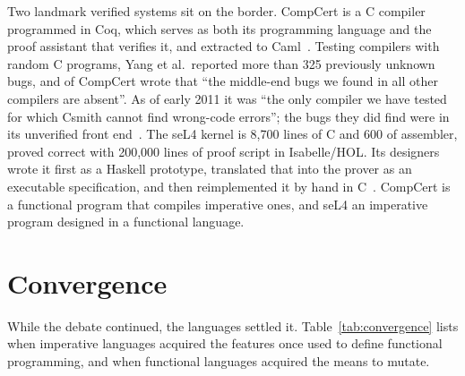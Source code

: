 \documentclass[11pt]{article}
\let\oldsection\section
\renewcommand{\section}{\Needspace{0.25\textheight}\oldsection}
\theoremstyle{definition}
\theoremstyle{remark}
\begin{document}
Two landmark verified systems sit on the border. CompCert is a C compiler
programmed in Coq, which serves as both its programming language and the
proof assistant that verifies it, and extracted to Caml~\cite{leroy}.
Testing compilers with random C programs, Yang et al.\ reported more
than 325 previously unknown bugs, and of CompCert wrote that ``the
middle-end bugs we found in all other compilers are absent''. As of early
2011 it was ``the only compiler we have tested for which Csmith cannot
find wrong-code errors''; the bugs they did find were in its unverified
front end~\cite{csmith}. The seL4 kernel is 8,700 lines of C and 600 of
assembler, proved correct with 200,000 lines of proof script in
Isabelle/HOL. Its designers
wrote it first as a Haskell prototype, translated that into the prover
as an executable specification, and then reimplemented it by hand in
C~\cite{sel4}. CompCert is a functional program that compiles imperative
ones, and seL4 an imperative program designed in a functional language.

\section{Convergence}\label{sec:convergence}

While the debate continued, the languages settled it.
Table~\ref{tab:convergence} lists when imperative languages acquired the
features once used to define functional programming, and when functional
languages acquired the means to mutate.
\end{document}
